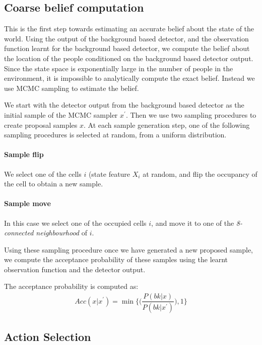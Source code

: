 \documentclass[10pt,twocolumn,letterpaper]{article}
\begin{document}
\subsection{Coarse belief computation}
This is the first step towards estimating an accurate belief about the state of the world. Using the output of the background based detector, and the observation function learnt for the background based detector, we compute the belief about the location of the people conditioned on the background based detector output. Since the state space is exponentially large in the number of people in the environment, it is impossible to analytically compute the exact belief. Instead we use MCMC sampling to estimate the belief. 

We start with the detector output from the background based detector as the initial sample of the MCMC sampler $x^{'}$. Then we use two sampling procedures to create proposal samples $x$. At each sample generation step, one of the following sampling procedures is selected at random, from a uniform distribution.
\paragraph{Sample flip}
We select one of the cells $i$ (state feature $X_{i}$ at random, and flip the occupancy of the cell to obtain a new sample.
\paragraph{Sample move} 
In this case we select one of the occupied cells $i$, and move it to one of the \textit{8-connected neighbourhood} of $i$.

Using these sampling procedure once we have generated a new proposed sample, we compute the acceptance probability of these samples using the learnt observation function and the detector output.

The acceptance probability is computed as:
\begin{align}
Acc(x|x^{'}) = \min\Big\lbrace\Big(\dfrac{P(bk|x)}{P(bk|x^{'})}\Big),1\Big\rbrace
\end{align}


\subsection{ Action Selection}
\end{document}
